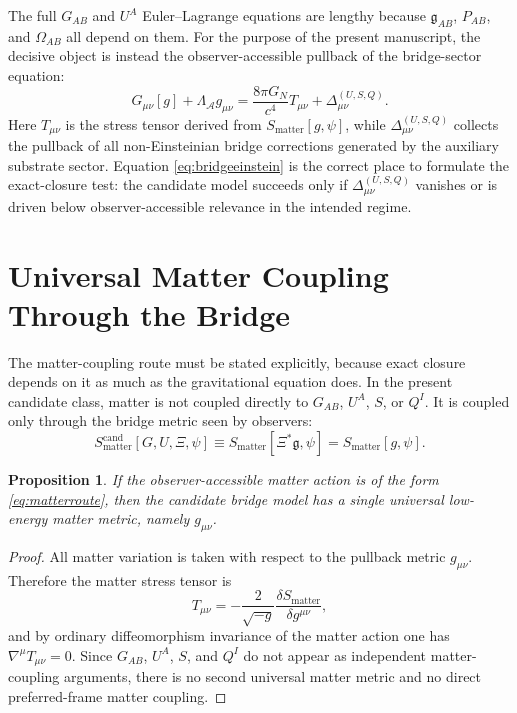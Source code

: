\documentclass[11pt]{article}
\newcommand{\Sub}{\mathcal{A}}
\newcommand{\BridgeMetric}{\mathfrak{g}}
\newtheorem{proposition}{Proposition}
\begin{document}
The full \(G_{AB}\) and \(U^A\) Euler--Lagrange equations are lengthy because \(\BridgeMetric_{AB}\), \(P_{AB}\), and \(\Omega_{AB}\) all depend on them. For the purpose of the present manuscript, the decisive object is instead the observer-accessible pullback of the bridge-sector equation:
\begin{equation}
G_{\mu\nu}[g]
+
\Lambda_{\Sub} g_{\mu\nu}
=
\frac{8\pi G_N}{c^4}T_{\mu\nu}
+
\Delta_{\mu\nu}^{(U,S,Q)}.
\label{eq:bridgeeinstein}
\end{equation}
Here \(T_{\mu\nu}\) is the stress tensor derived from \(S_{\mathrm{matter}}[g,\psi]\), while \(\Delta_{\mu\nu}^{(U,S,Q)}\) collects the pullback of all non-Einsteinian bridge corrections generated by the auxiliary substrate sector. Equation \eqref{eq:bridgeeinstein} is the correct place to formulate the exact-closure test: the candidate model succeeds only if \(\Delta_{\mu\nu}^{(U,S,Q)}\) vanishes or is driven below observer-accessible relevance in the intended regime.

\section{Universal Matter Coupling Through the Bridge}

The matter-coupling route must be stated explicitly, because exact closure depends on it as much as the gravitational equation does. In the present candidate class, matter is not coupled directly to \(G_{AB}\), \(U^A\), \(S\), or \(Q^I\). It is coupled only through the bridge metric seen by observers:
\begin{equation}
S_{\mathrm{matter}}^{\mathrm{cand}}[G,U,\Xi,\psi]
\equiv
S_{\mathrm{matter}}[\Xi^*\BridgeMetric,\psi]
=
S_{\mathrm{matter}}[g,\psi].
\label{eq:matterroute}
\end{equation}

\begin{proposition}
If the observer-accessible matter action is of the form \eqref{eq:matterroute}, then the candidate bridge model has a single universal low-energy matter metric, namely \(g_{\mu\nu}\).
\end{proposition}

\begin{proof}
All matter variation is taken with respect to the pullback metric \(g_{\mu\nu}\). Therefore the matter stress tensor is
\[
T_{\mu\nu}
=
-\frac{2}{\sqrt{-g}}
\frac{\delta S_{\mathrm{matter}}}{\delta g^{\mu\nu}},
\]
and by ordinary diffeomorphism invariance of the matter action one has \(\nabla^\mu T_{\mu\nu}=0\). Since \(G_{AB}\), \(U^A\), \(S\), and \(Q^I\) do not appear as independent matter-coupling arguments, there is no second universal matter metric and no direct preferred-frame matter coupling.
\end{proof}
\end{document}
